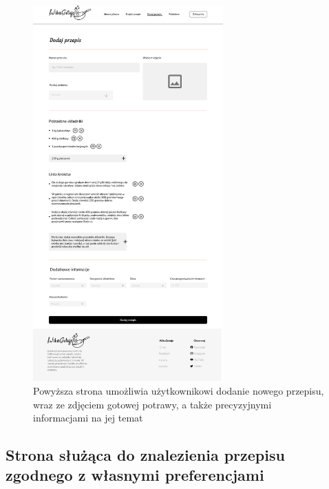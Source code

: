 \documentclass{article}
\begin{document}
\begin{figure}[H]
    \begin{center}
        \includegraphics[width=0.65\textwidth]{mockups/adding_recipe}
    \end{center}
    \caption{Powyższa strona umożliwia użytkownikowi dodanie nowego przepisu, wraz ze zdjęciem gotowej potrawy, a także precyzyjnymi informacjami na jej temat}
\end{figure}

\newpage

\subsection{Strona służąca do znalezienia przepisu zgodnego z własnymi preferencjami}
\end{document}
